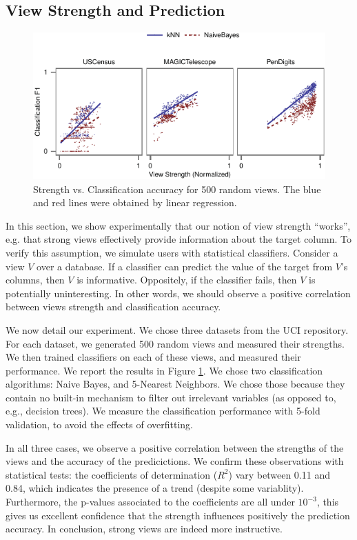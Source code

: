 \subsection{View Strength and Prediction}
\label{sec:view-strengh}

\begin{figure}[t!]
\centering
\includegraphics[width=\columnwidth]{plots/compare-strength-f1}
\caption{Strength vs. Classification accuracy for 500 random views. The blue
and red lines were obtained by linear regression.}
\label{pic:strength-vs-f1}
\end{figure}
In this section, we show experimentally that our notion of view strength
``works'', e.g. that strong views effectively provide information about the
target column. To verify this assumption, we simulate users with statistical
classifiers. Consider a view $V$ over a database. If a classifier can predict
the value of the target from $V$'s columns, then $V$ is informative.
Oppositely, if the classifier fails, then $V$ is potentially uninteresting. In
other words, we should observe a positive correlation between views strength
and classification accuracy.

We now detail our experiment. We chose three datasets from the UCI repository.
For each dataset, we generated 500 random views and measured their strengths.
We then trained classifiers on each of these views, and measured their
performance. We report the results in Figure \ref{pic:strength-vs-f1}. We chose
two classification algorithms: Naive Bayes, and 5-Nearest Neighbors.  We chose
those because they contain no built-in mechanism to filter out irrelevant
variables (as opposed to, e.g., decision trees). We measure the classification
performance with 5-fold validation, to avoid the effects of overfitting.

In all three cases, we observe a positive correlation between the strengths of
the views and the accuracy of the predicictions. We confirm these observations
with statistical tests: the coefficients of determination ($R^2$) vary between
0.11 and 0.84, which indicates the presence of a trend (despite some
variablity). Furthermore, the p-values associated to the coefficients are all
under $10^{-3}$, this gives us excellent confidence that the strength
influences positively the prediction accuracy. In conclusion, strong views are
indeed more instructive.


